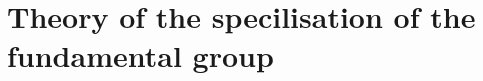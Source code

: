 \documentclass[../main.tex]{subfiles}
\begin{document}
\setcounter{chapter}{9}
\chapter{Theory of the specilisation of the fundamental group}
\end{document}

